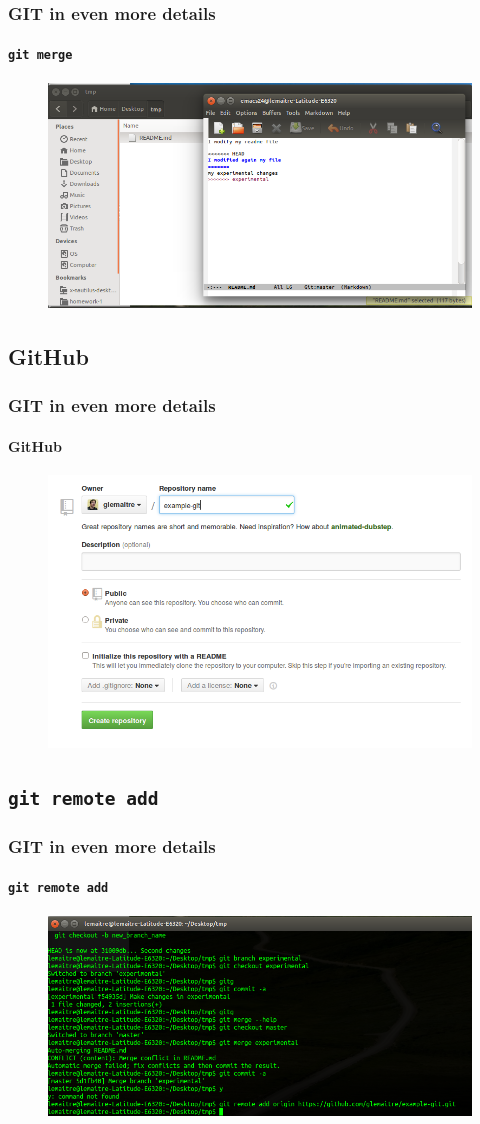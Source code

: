 \documentclass{beamer}
\begin{document}
\begin{frame}
  \frametitle{GIT in even more details}
  \framesubtitle{\texttt{git merge}}
  \begin{figure}
      \centering
      \includegraphics[width=.65\textwidth]{./images/workflow/conflict.png}
    \end{figure}
\end{frame}

\subsection{GitHub}

\begin{frame}
  \frametitle{GIT in even more details}
  \framesubtitle{GitHub}
  \begin{figure}
      \centering
      \includegraphics[width=.65\textwidth]{./images/workflow/github-1.png}
    \end{figure}
\end{frame}

\subsection{\texttt{git remote add}}

\begin{frame}
  \frametitle{GIT in even more details}
  \framesubtitle{\texttt{git remote add}}
  \begin{figure}
      \centering
      \includegraphics[width=.65\textwidth]{./images/workflow/remote-add.png}
    \end{figure}
\end{frame}
\end{document}
